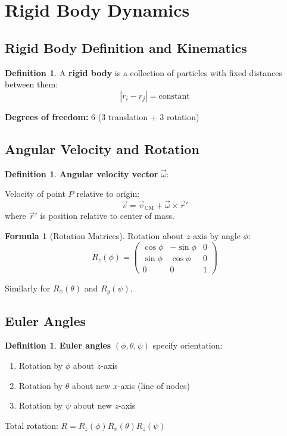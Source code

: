 \documentclass[12pt,a4paper]{article}
\theoremstyle{definition}
\newtheorem{definition}[theorem]{Definition}
\newtheorem{formula}[theorem]{Formula}
\begin{document}
\newpage
\section{Rigid Body Dynamics}

\subsection{Rigid Body Definition and Kinematics}

\begin{definition}
A \textbf{rigid body} is a collection of particles with fixed distances between them:
\[
|r_i - r_j| = \text{constant}
\]

\textbf{Degrees of freedom:} 6 (3 translation + 3 rotation)
\end{definition}

\subsection{Angular Velocity and Rotation}

\begin{definition}
\textbf{Angular velocity vector} $\vec{\omega}$:

Velocity of point $P$ relative to origin:
\[
\vec{v} = \vec{v}_{\text{CM}} + \vec{\omega} \times \vec{r}'
\]
where $\vec{r}'$ is position relative to center of mass.
\end{definition}

\begin{formula}[Rotation Matrices]
Rotation about $z$-axis by angle $\phi$:
\[
R_z(\phi) = \begin{pmatrix}
\cos\phi & -\sin\phi & 0 \\
\sin\phi & \cos\phi & 0 \\
0 & 0 & 1
\end{pmatrix}
\]

Similarly for $R_x(\theta)$ and $R_y(\psi)$.
\end{formula}

\subsection{Euler Angles}

\begin{definition}
\textbf{Euler angles} $(\phi, \theta, \psi)$ specify orientation:
\begin{enumerate}
    \item Rotation by $\phi$ about $z$-axis
    \item Rotation by $\theta$ about new $x$-axis (line of nodes)
    \item Rotation by $\psi$ about new $z$-axis
\end{enumerate}

Total rotation: $R = R_z(\phi)R_x(\theta)R_z(\psi)$
\end{definition}
\end{document}

